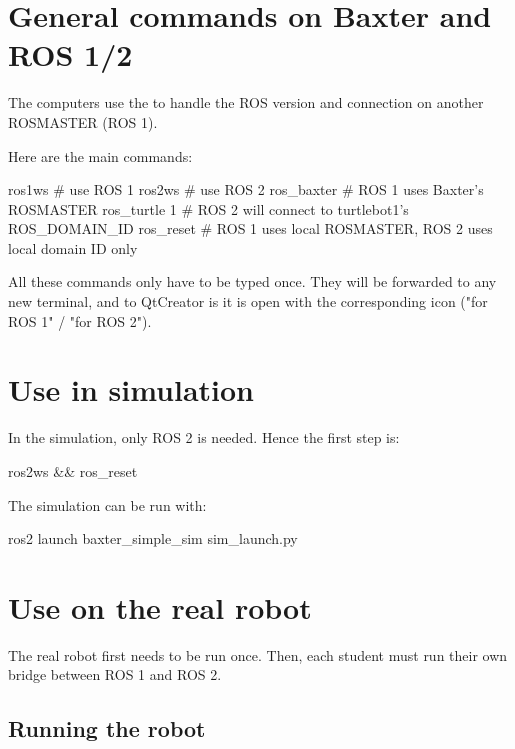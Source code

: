 \documentclass{ecnreport}
\author{O. Kermorgant}
\begin{document}


\section{General commands on Baxter and ROS 1/2}

The computers use the  to handle the ROS version and connection on another ROSMASTER (ROS 1).

Here are the main commands:
\begin{bashcodelarge}
ros1ws  # use ROS 1
ros2ws # use ROS 2
ros_baxter # ROS 1 uses Baxter's ROSMASTER
ros_turtle 1  # ROS 2 will connect to turtlebot1's ROS_DOMAIN_ID
ros_reset # ROS 1 uses local ROSMASTER, ROS 2 uses local domain ID only
\end{bashcodelarge}

All these commands only have to be typed once. They will be forwarded to any new terminal, and to QtCreator is it is open with the corresponding icon ("for ROS 1" / "for ROS 2").

\section{Use in simulation}

In the simulation, only ROS 2 is needed. Hence the first step is:
\begin{bashcodelarge}
ros2ws && ros_reset
\end{bashcodelarge}

The simulation can be run with:
\begin{bashcodelarge}
 ros2 launch baxter_simple_sim sim_launch.py
\end{bashcodelarge}

\section{Use on the real robot}

The real robot first needs to be run once. Then, each student must run their own bridge between ROS 1 and ROS 2.

\subsection{Running the robot}
\end{document}
